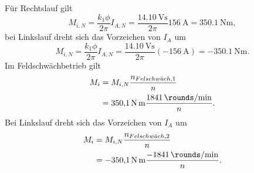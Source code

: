 \documentclass[11pt,a4paper]{scrartcl}
\newcommand{\mybr}[1]{\left(#1\right)}
\newcommand{\0}{_{\mybr{0}}}
\newcommand{\1}{_{\mybr{1}}}
\newcommand{\2}{_{\mybr{2}}}
\begin{document}
\subsection{}
Für Rechtslauf gilt
\begin{equation}
M_{i,N}=\frac{k_1\phi}{2\pi}I_{A,N}=\frac{\SI{14.10}{\volt\second}}{2\pi}\SI{156}{\ampere}=\SI{350.1}{\newton\metre},
\end{equation}
bei Linkslauf dreht sich das Vorzeichen von $I_A$ um
\begin{equation}
M_{i,N}=\frac{k_1\phi}{2\pi}I_{A,N}=\frac{\SI{14.10}{\volt\second}}{2\pi}\mybr{\SI{-156}{\ampere}}=\SI{-350.1}{\newton\metre}.
\end{equation}
Im Feldschwächbetrieb gilt
\begin{align}
M_i&=M_{i,N}\frac{n_{Felschw\ddot{a}ch,1}}{n}\\
&=\SI{350.1}{\newton\metre}\frac{\SI{1841}{\rounds\per\minute}}{n}.
\end{align}
Bei Linkslauf dreht sich das Vorzeichen von $I_A$ um
\begin{align}
M_i&=M_{i,N}\frac{n_{Felschw\ddot{a}ch,2}}{n}\\
&=\SI{-350.1}{\newton\metre}\frac{\SI{-1841}{\rounds\per\minute}}{n}.
\end{align}
\begin{figure*}[!htb]
\centering
{}
\end{figure*}
\end{document}
